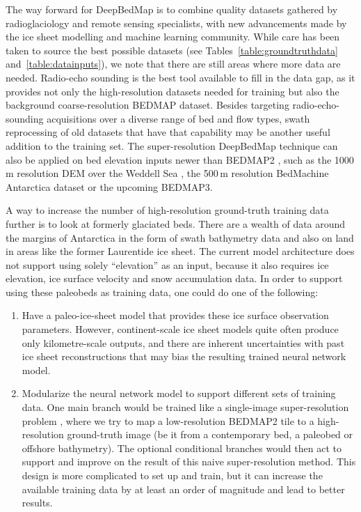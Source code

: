 The way forward for DeepBedMap is to combine quality datasets gathered by radioglaciology and remote sensing specialists, with new advancements made by the ice sheet modelling and machine learning community.
While care has been taken to source the best possible datasets (see Tables~\ref{table:groundtruthdata} and~\ref{table:datainputs}), we note that there are still areas where more data are needed.
Radio-echo sounding is the best tool available to fill in the data gap, as it provides not only the high-resolution datasets needed for training but also the background coarse-resolution BEDMAP dataset.
Besides targeting radio-echo-sounding acquisitions over a diverse range of bed and flow types, swath reprocessing of old datasets that have that capability \citep{HolschuhLinkingpostglaciallandscapes2020} may be another useful addition to the training set.
The super-resolution DeepBedMap technique can also be applied on bed elevation inputs newer than BEDMAP2 \citep{FretwellBedmap2improvedice2013}, such as the 1000\,\unit{m} resolution DEM over the Weddell Sea \citep{Jeofry1KmBedTopography2017}, the 500\,\unit{m} resolution BedMachine Antarctica dataset \citep{MorlighemMEaSUREsBedMachineAntarctica2019} or the upcoming BEDMAP3.

A way to increase the number of high-resolution ground-truth training data further is to look at formerly glaciated beds.
There are a wealth of data around the margins of Antarctica in the form of swath bathymetry data and also on land in areas like the former Laurentide ice sheet.
The current model architecture does not support using solely ``elevation'' as an input, because it also requires ice elevation, ice surface velocity and snow accumulation data.
In order to support using these paleobeds as training data, one could do one of the following:

\begin{enumerate}
  \item Have a paleo-ice-sheet model that provides these ice surface observation parameters.
  However, continent-scale ice sheet models quite often produce only kilometre-scale outputs, and there are inherent uncertainties with past ice sheet reconstructions that may bias the resulting trained neural network model.

  \item Modularize the neural network model to support different sets of training data.
  One main branch would be trained like a single-image super-resolution problem \citep{YangDeepLearningSingle2019}, where we try to map a low-resolution BEDMAP2 tile to a high-resolution ground-truth image (be it from a contemporary bed, a paleobed or offshore bathymetry).
  The optional conditional branches would then act to support and improve on the result of this naive super-resolution method.
  This design is more complicated to set up and train, but it can increase the available training data by at least an order of magnitude and lead to better results.
\end{enumerate}

